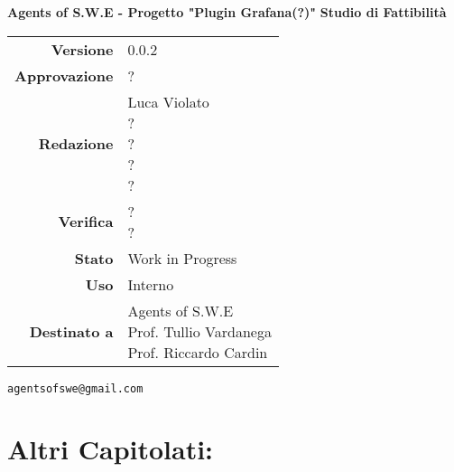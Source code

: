 


\begin{titlepage}
\thispagestyle{empty}

\begin{center}
\large \textbf{Agents of S.W.E - Progetto "Plugin Grafana(?)"}
\vfill
\Huge \textbf{Studio di Fattibilità}
\vfill
\large
\renewcommand{\arraystretch}{1.3}
\begin{tabular}{r|l}
\textbf{Versione} & 0.0.2\\
\textbf{Approvazione} & ?\\
\textbf{Redazione} & \parbox[t]{5cm}{Luca Violato\\?\\?\\?\\?}\\
\textbf{Verifica} & \parbox[t]{5cm}{?\\?}\\
\textbf{Stato} & Work in Progress\\
\textbf{Uso} & Interno\\
\textbf{Destinato a} & \parbox[t]{5cm}{Agents of S.W.E \\Prof. Tullio Vardanega\\Prof. Riccardo Cardin}
\end{tabular}
\vfill
\small
\texttt{agentsofswe@gmail.com}
\end{center}
\end{titlepage}

\pagebreak

\tableofcontents

\pagebreak



\pagebreak

\section{Altri Capitolati:}



\pagebreak



\pagebreak



\pagebreak



\pagebreak



\pagebreak



\pagebreak




